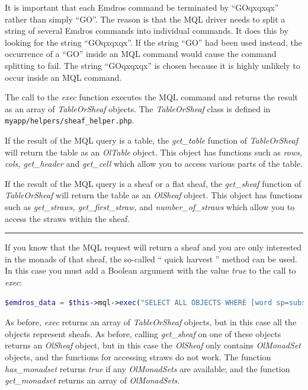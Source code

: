 \documentclass[11pt,oneside,a4paper]{memoir}
\newcommand*{\indexw}[1]{%
  #1%
  \index{#1}%
}
\begin{document}
It is important that each Emdros command be terminated by ``GOqxqxqx'' rather than simply ``GO''. The
reason is that the MQL driver needs to split a string of several Emdros commands into individual
commands. It does this by looking for the string ``GOqxqxqx''. If the string ``GO'' had been used
instead, the occurrence of a ``GO'' inside an MQL command would cause the command splitting to fail.
The string ``GOqxqxqx'' is chosen because it is highly unlikely to occur inside an MQL command.

The call to the \emph{exec} function executes the MQL command and returns the result as an array of
\emph{TableOrSheaf} objects. The \emph{TableOrSheaf} class is defined in
\texttt{myapp/helpers/sheaf\_helper.php}.

If the result of the MQL query is a table, the \emph{get\_table} function of \emph{TableOrSheaf}
will return the table as an \emph{OlTable} object.  This object has functions
such as \emph{rows, cols, get\_header} and \emph{get\_cell} which allow you to
access various parts of the table.

If the result of the MQL query is a sheaf or a flat sheaf, the \emph{get\_sheaf} function of
\emph{TableOrSheaf} will return the table as an \emph{OlSheaf} object. This object has functions
such as \emph{get\_straws, get\_first\_straw,} and \emph{number\_of\_straws} which allow you to
access the straws within the sheaf.

\pfbreak

If you know that the MQL request will return a sheaf and you are only interested in the monads of
that sheaf, the so-called ``\indexw{quick harvest}'' method can be used. In
this case you must add a Boolean argument with the value \emph{true} to the call to \emph{exec}:

\begin{lstlisting}[language=PHP]
$emdros_data = $this->mql->exec("SELECT ALL OBJECTS WHERE [word sp=subs] GOqxqxqx", true);
\end{lstlisting}

As before, \emph{exec} returns an array of \emph{TableOrSheaf} objects, but in this case all the
objects represent sheafs. As before, calling \emph{get\_sheaf} on one of these objects returns an
\emph{OlSheaf} object, but in this case the \emph{OlSheaf} only contains \emph{OlMonadSet} objects, and the
functions for accessing straws do not work. The function \emph{has\_monadset} returns \emph{true} if
any \emph{OlMonadSets} are available; and the function \emph{get\_monadset} returns an array of
\emph{OlMonadSets}.
\end{document}
